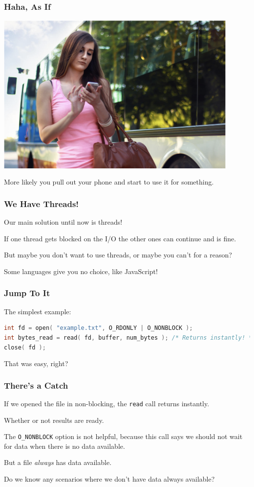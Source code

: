 \begin{frame}
\frametitle{Haha, As If}

\begin{center}
	\includegraphics[width=0.9\textwidth]{images/textbus.png}
\end{center}

More likely you pull out your phone and start to use it for something. 

\end{frame}

\begin{frame}
\frametitle{We Have Threads!}

Our main solution until now is threads! 

If one thread gets blocked on the I/O the other ones can continue and is fine. 

But maybe you don't want to use threads, or maybe you can't for a reason?

Some languages give you no choice, like JavaScript!

\end{frame}


\begin{frame}[fragile]
\frametitle{Jump To It}

The simplest example:

\begin{lstlisting}[language=C]
int fd = open( "example.txt", O_RDONLY | O_NONBLOCK );
int bytes_read = read( fd, buffer, num_bytes ); /* Returns instantly! */
close( fd );
\end{lstlisting}

That was easy, right?

\end{frame}


\begin{frame}
\frametitle{There's a Catch}

If we opened the file in non-blocking, the \texttt{read} call returns instantly. 

Whether or not results are ready. 

 The \texttt{O\_NONBLOCK} option is not helpful, because this call says we should not wait for data when there is no data available. 
 
 But a file \textit{always} has data available. 

Do we know any scenarios where we don't have data always available?

\end{frame}


